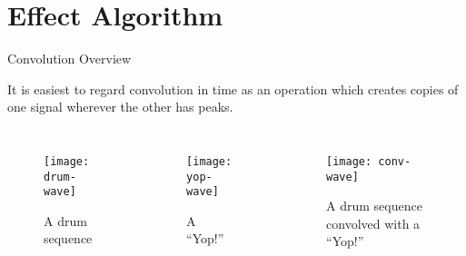 \section{Effect Algorithm}


\begin{frame}{Convolution Overview}

    It is easiest to regard convolution in time as an operation which creates copies of one signal wherever the other has peaks.

    \begin{columns}[t]

        \begin{figure}
            \texttt{[image: drum-wave]}
            \caption{A drum sequence}
        \end{figure}

        \begin{figure}
            \texttt{[image: yop-wave]}
            \caption{A ``Yop!''}
        \end{figure}

        \begin{figure}
            \texttt{[image: conv-wave]}
            \caption{A drum sequence convolved with a ``Yop!''}
        \end{figure}

    \end{columns}

\end{frame}
